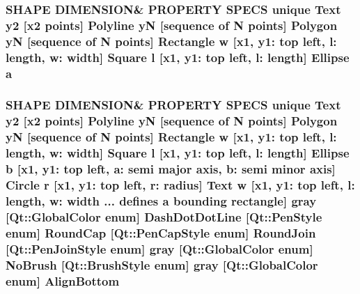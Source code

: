 \subsubsection[{\texorpdfstring{a}{a}}]{\setlength{\rightskip}{0pt plus 5cm}S\+H\+A\+PE D\+I\+M\+E\+N\+S\+I\+ON\& P\+R\+O\+P\+E\+R\+TY S\+P\+E\+CS unique {\bf Text} {\bf y2} \mbox{[}{\bf x2} points\mbox{]} {\bf Polyline} yN \mbox{[}sequence of N points\mbox{]} {\bf Polygon} yN \mbox{[}sequence of N points\mbox{]} {\bf Rectangle} w \mbox{[}{\bf x1}, y1\+: top left, l\+: length, w\+: width\mbox{]} {\bf Square} {\bf l} \mbox{[}{\bf x1}, y1\+: top left, l\+: length\mbox{]} {\bf Ellipse} a}\hypertarget{shape__input__file__specs_8txt_ae28cf074afc52317b2105a81fa268a8c}{}\label{shape__input__file__specs_8txt_ae28cf074afc52317b2105a81fa268a8c}
\subsubsection[{\texorpdfstring{Align\+Bottom}{AlignBottom}}]{\setlength{\rightskip}{0pt plus 5cm}S\+H\+A\+PE D\+I\+M\+E\+N\+S\+I\+ON\& P\+R\+O\+P\+E\+R\+TY S\+P\+E\+CS unique {\bf Text} {\bf y2} \mbox{[}{\bf x2} points\mbox{]} {\bf Polyline} yN \mbox{[}sequence of N points\mbox{]} {\bf Polygon} yN \mbox{[}sequence of N points\mbox{]} {\bf Rectangle} w \mbox{[}{\bf x1}, y1\+: top left, l\+: length, w\+: width\mbox{]} {\bf Square} {\bf l} \mbox{[}{\bf x1}, y1\+: top left, l\+: length\mbox{]} {\bf Ellipse} b \mbox{[}{\bf x1}, y1\+: top left, a\+: semi major axis, b\+: semi minor axis\mbox{]} {\bf Circle} r \mbox{[}{\bf x1}, y1\+: top left, r\+: radius\mbox{]} {\bf Text} w \mbox{[}{\bf x1}, y1\+: top left, l\+: length, w\+: width ... defines {\bf a} bounding rectangle\mbox{]} gray \mbox{[}Qt\+::\+Global\+Color enum\mbox{]} Dash\+Dot\+Dot\+Line \mbox{[}Qt\+::\+Pen\+Style enum\mbox{]} Round\+Cap \mbox{[}{\bf Qt\+::\+Pen\+Cap\+Style} enum\mbox{]} Round\+Join \mbox{[}{\bf Qt\+::\+Pen\+Join\+Style} enum\mbox{]} gray \mbox{[}Qt\+::\+Global\+Color enum\mbox{]} No\+Brush \mbox{[}{\bf Qt\+::\+Brush\+Style} enum\mbox{]} gray \mbox{[}Qt\+::\+Global\+Color enum\mbox{]} Align\+Bottom}\hypertarget{shape__input__file__specs_8txt_af05cf9503398beaab2d0f1cde0af87ff}{}\label{shape__input__file__specs_8txt_af05cf9503398beaab2d0f1cde0af87ff}
